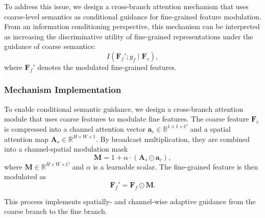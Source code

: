 \documentclass[pdflatex,sn-mathphys-num]{sn-jnl}
\theoremstyle{thmstyleone}%
\theoremstyle{thmstyletwo}%
\theoremstyle{thmstylethree}%
\begin{document}
To address this issue, we design a cross-branch attention mechanism that uses coarse-level semantics as conditional guidance for fine-grained feature modulation. From an information conditioning perspective, this mechanism can be interpreted as increasing the discriminative utility of fine-grained representations under the guidance of coarse semantics:
\begin{equation}
I(\mathbf{F}_f'; y_f \mid \mathbf{F}_c),
\end{equation}
where $\mathbf{F}_f'$ denotes the modulated fine-grained features.

\subsubsection{Mechanism Implementation}
To enable conditional semantic guidance, we design a cross-branch attention module that uses coarse features to modulate fine features. 
The coarse feature $\mathbf{F}_c$ is compressed into a channel attention vector $\mathbf{a}_c \in \mathbb{R}^{1\times1\times C}$ and a spatial attention map $\mathbf{A}_s \in \mathbb{R}^{H \times W \times 1}$. 
By broadcast multiplication, they are combined into a channel-spatial modulation mask
\begin{equation}
\mathbf{M} = 1 + \alpha \cdot (\mathbf{A}_s \odot \mathbf{a}_c),
\label{eq:attention_mask}
\end{equation}
where $\mathbf{M}\in\mathbb{R}^{H\times W\times C}$ and $\alpha$ is a learnable scalar. 
The fine-grained feature is then modulated as
\begin{equation}
\mathbf{F}_f' = \mathbf{F}_f \odot \mathbf{M}.
\label{eq:feature_modulation}
\end{equation}

This process implements spatially- and channel-wise adaptive guidance from the coarse branch to the fine branch.
\end{document}
